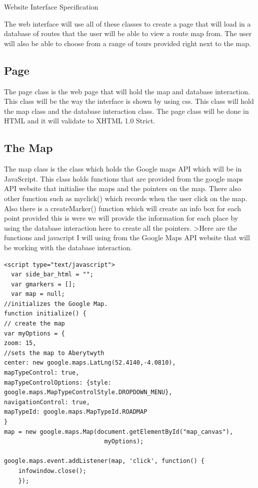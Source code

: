 \documentclass{article}
\begin{document}
	\begin{section}{Website Interface Specification}

The web interface will use all of these classes to create a page that will load in a database of routes that the user will be able to view a route map from. The user will also be able to choose from a range of tours provided right next to the map. 

\subsection{Page}
The page class is the web page that will hold the map and database interaction. This class will be the way the interface is shown by using css. This class will hold the map class and the database interaction class. The page class will be done in HTML and it will validate to XHTML 1.0 Strict. 

\subsection{The Map}
The map class is the class which holds the Google maps API which will be in JavaScript. This class holds functions that are provided from the google maps API website that initialise the maps and the pointers on the map. There also other function such as myclick() which records when the user click on the map. Also there is a createMarker() function which will create an info box for each point provided this is were we will provide the information for each place by using the database interaction here to create all the pointers.
>Here are the functions and javacript I will using from the Google Maps API website that will be working with the database interaction.

\clearpage
\begin{lstlisting}[caption=Google Maps API Javascript Example]
<script type="text/javascript"> 
  var side_bar_html = ""; 
  var gmarkers = []; 
  var map = null;
//initializes the Google Map.
function initialize() {
// create the map
var myOptions = {
zoom: 15,
//sets the map to Aberytwyth
center: new google.maps.LatLng(52.4140,-4.0810),
mapTypeControl: true,
mapTypeControlOptions: {style: google.maps.MapTypeControlStyle.DROPDOWN_MENU},
navigationControl: true,
mapTypeId: google.maps.MapTypeId.ROADMAP
}
map = new google.maps.Map(document.getElementById("map_canvas"),
                            myOptions);

google.maps.event.addListener(map, 'click', function() {
    infowindow.close();
    });


\end{lstlisting}
\end{section}
\end{document}

